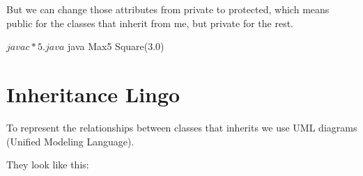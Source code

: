 \documentclass[a4paper, 9pt]{extarticle}
\begin{document}
But we can change those attributes from private to protected, which means
public for the classes that inherit from me, but private for the rest.

\begin{multicols}{2}
\columnbreak
\end{multicols}

\begin{blackboard}
$ javac *5.java
$ java Max5
Square(3.0)
\end{blackboard}





\section{Inheritance Lingo}

To represent the relationships between classes that inherits we use UML
diagrams (Unified Modeling Language).

They look like this:
\end{document}
